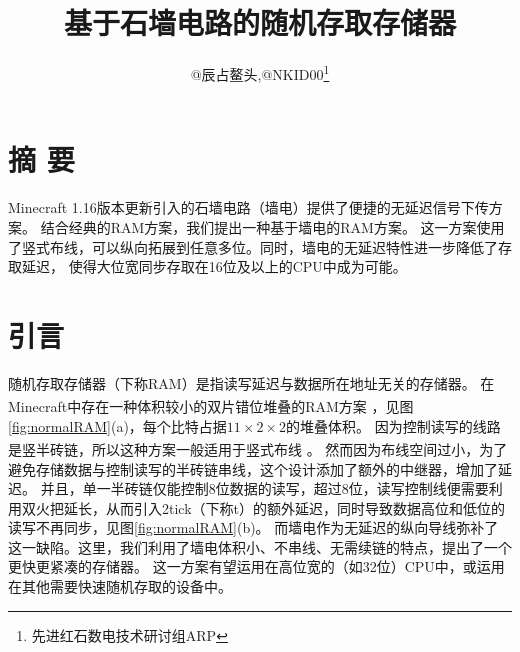 \documentclass[UTF8,12pt,punct=kaiming,fontset=none]{article}
\title{\vspace{-1.5cm}基于石墙电路的随机存取存储器\vspace{-0.5cm}}
\author{@辰占鳌头,@NKID00\thanks{先进红石数电技术研讨组ARP}}
\date{}
\newcommand*{\upcite}[1]{
    \textsuperscript{\cite{#1}}
}
\begin{document}
\maketitle
    \thispagestyle{fancy} %
    \vspace{-0.7cm}

    \begin{minipage}[c]{0.75\linewidth}
        \titleformat{\section}[wrap]{\sffamily\small\bfseries}{}{0cm}{}
        \titlespacing{\section}{2cm}{1ex}{0.4cm}

        \section{摘 \hspace{0.11cm} 要}
        \small Minecraft 1.16版本更新引入的石墙电路（墙电）提供了便捷的无延迟信号下传方案。
        结合经典的RAM方案，我们提出一种基于墙电的RAM方案。
        这一方案使用了竖式布线，可以纵向拓展到任意多位。同时，墙电的无延迟特性进一步降低了存取延迟，
        使得大位宽同步存取在16位及以上的CPU中成为可能。

    \end{minipage}
    \vspace{0.2cm}

    \titleformat{\section}[hang]{\large\sffamily\bfseries}{\textmd{\thesection}}{0.5cm}{}
    \titlespacing{\section}{0cm}{0.5ex}{0.2ex}
    \setcounter{section}{-1}

\section{引言}
随机存取存储器（下称RAM）是指读写延迟与数据所在地址无关的存储器。
在Minecraft中存在一种体积较小的双片错位堆叠的RAM方案\upcite{ORE}，见图\ref{fig:normalRAM}(a)，每个比特占据$11\times 2\times 2$的堆叠体积。
因为控制读写的线路是竖半砖链，所以这种方案一般适用于竖式布线\upcite{Vertical}。
然而因为布线空间过小，为了避免存储数据与控制读写的半砖链串线，这个设计添加了额外的中继器，增加了延迟。
并且，单一半砖链仅能控制8位数据的读写，超过8位，读写控制线便需要利用双火把延长，从而引入2tick（下称t）的额外延迟，同时导致数据高位和低位的读写不再同步，见图\ref{fig:normalRAM}(b)。
而墙电作为无延迟的纵向导线弥补了这一缺陷。这里，我们利用了墙电体积小、不串线、无需续链的特点，提出了一个更快更紧凑的存储器。
这一方案有望运用在高位宽的（如32位）CPU中，或运用在其他需要快速随机存取的设备中。
\end{document}
